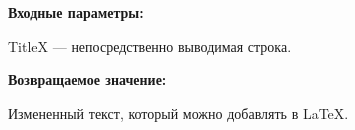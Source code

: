 \textbf{Входные параметры:}

TitleX --- непосредственно выводимая строка.

\textbf{Возвращаемое значение:}

Измененный текст, который можно добавлять в LaTeX.